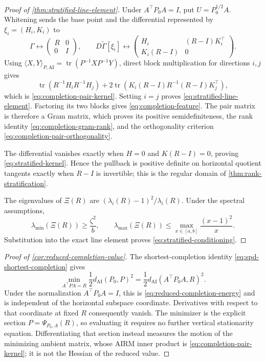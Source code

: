 \documentclass[10pt]{article}
\theoremstyle{plain}
\theoremstyle{definition}
\theoremstyle{remark}
\newcommand{\AI}{\mathrm{AI}}
\newcommand{\tr}{\operatorname{tr}}
\newcommand{\dai}{d_{\AI}}
\newcommand{\Xiop}{\Xi}
\begin{document}
\begin{proof}[Proof of \cref{thm:stratified-line-element}]
Under \(A^\top P_0A=I\), put \(U=P_0^{1/2}A\).  Whitening sends the base
point and the differential represented by \(\xi_i=(H_i,K_i)\) to
\[
  \Gamma\longleftrightarrow
  \begin{pmatrix}R&0\\0&I\end{pmatrix},
  \qquad
  D\widetilde\Gamma[\xi_i]\longleftrightarrow
  \begin{pmatrix}
    H_i&(R-I)K_i^\top\\
    K_i(R-I)&0
  \end{pmatrix}.
\]
Using
\(
\langle X,Y\rangle_{P,\AI}=\tr(P^{-1}XP^{-1}Y)
\), direct block multiplication for directions \(i,j\) gives
\[
  \tr(R^{-1}H_iR^{-1}H_j)
  +2\tr(K_i(R-I)R^{-1}(R-I)K_j^\top),
\]
which is \eqref{eq:completion-pair-kernel}.  Setting \(i=j\) proves
\eqref{eq:stratified-line-element}.  Factoring its two blocks gives
\eqref{eq:completion-feature}.  The pair matrix is therefore a Gram matrix,
which proves its positive semidefiniteness, the rank identity
\eqref{eq:completion-gram-rank}, and the orthogonality criterion
\eqref{eq:completion-pair-orthogonality}.

The differential vanishes exactly when \(H=0\) and \(K(R-I)=0\), proving
\eqref{eq:stratified-kernel}.  Hence the pullback is positive definite on
horizontal quotient tangents exactly when \(R-I\) is invertible; this is the
regular domain of \cref{thm:rank-stratification}.

The eigenvalues of \(\Xiop(R)\) are
\((\lambda_i(R)-1)^2/\lambda_i(R)\).  Under the spectral assumptions,
\[
  \lambda_{\min}(\Xiop(R))\ge\frac{\zeta^2}{b},
  \qquad
  \lambda_{\max}(\Xiop(R))
  \le\max_{x\in[a,b]}\frac{(x-1)^2}{x}.
\]
Substitution into the exact line element proves
\eqref{eq:stratified-conditioning}.
\end{proof}

\begin{proof}[Proof of \cref{cor:reduced-completion-value}]
The shortest-completion identity \eqref{eq:spd-shortest-completion} gives
\[
  \min_{A^\top PA=R}\frac12\dai(P_0,P)^2
  =\frac12\dai(A^\top P_0A,R)^2.
\]
Under the normalization \(A^\top P_0A=I\), this is
\eqref{eq:reduced-completion-energy} and is independent of the horizontal
subspace coordinate.  Derivatives with respect to that coordinate at fixed
\(R\) consequently vanish.  The minimizer is the explicit section
\(P=\Psi_{P_0,A}(R)\), so evaluating it requires no further vertical
stationarity equation.  Differentiating that section instead measures the
motion of the minimizing ambient matrix, whose AIRM inner product is
\eqref{eq:completion-pair-kernel}; it is not the Hessian of the reduced value.
\end{proof}
\end{document}
